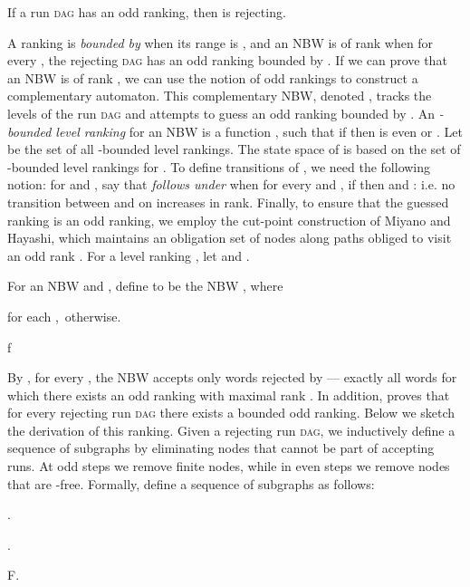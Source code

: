\documentclass{LMCS}
\newcommand{\DAG}{\textsc{dag}\xspace}
\begin{document}
\begin{lem}\label{Odd_Ranking_Rejecting}{\rm\cite{KV01c}}
If a run \DAG  has an odd ranking, then  is rejecting.
\end{lem}

A ranking is \emph{bounded by } when its range is , and an NBW  is of rank 
when for every , the rejecting \DAG  has an odd ranking bounded by . If we
can prove that an NBW  is of rank , we can use the notion of odd rankings to construct a
complementary automaton. This complementary NBW, denoted , tracks the levels of the run \DAG
and attempts to guess an odd ranking bounded by .  An \emph{-bounded level ranking} for an NBW
 is a function , such that if  then  is
even or .  Let  be the set of all -bounded level rankings.  The state space of
 is based on the set of -bounded level rankings for .  To define transitions of
, we need the following notion: for  and , say that
\emph{ follows  under } when for every  and , if  then  and : i.e. no transition between  and  on
 increases in rank.  Finally, to ensure that the guessed ranking is an odd ranking, we
employ the cut-point construction of Miyano and Hayashi, which maintains an obligation set of nodes
along paths obliged to visit an odd rank \cite{MH84}. For a level ranking , let
 and .

\begin{defi}\label{KVDef}
For an NBW   and , define
 to be the NBW , where
\smallskip
\begin{iteMize}{}
\item  for each ,\  otherwise.
\smallskip
\item 
f\sigmaf\sigma
\end{iteMize}
\end{defi}



By \cite{KV01c}, for every , the NBW  accepts only words rejected by  ---
exactly all words for which there exists an odd ranking with maximal rank . In addition,
\cite{KV01c} proves that for every rejecting run \DAG there exists a bounded odd ranking.  Below we
sketch the derivation of this ranking. Given a rejecting run \DAG , we inductively define a
sequence of subgraphs by eliminating nodes that cannot be part of accepting runs.  At odd steps we
remove finite nodes, while in even steps we remove nodes that are -free.  Formally, define a
sequence of subgraphs as follows:

\smallskip
\begin{iteMize}{}
\item .
\smallskip
\item .
\smallskip
\item F.
\end{iteMize}
\medskip
\end{document}
